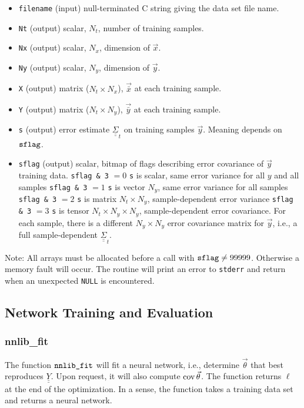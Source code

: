 \documentclass{article}    %
\newcommand{\dbul}[1]{\underline{\underline{#1}}}
\newcommand{\cov}{\mathop{{\rm cov}}}
\begin{document}
\begin{itemize}
\item \verb|filename| (input) null-terminated C string giving the data set file name.
\item \verb|Nt| (output) scalar, $N_t$, number of training samples.
\item \verb|Nx| (output) scalar, $N_x$, dimension of $\vec{x}$.
\item \verb|Ny| (output) scalar, $N_y$, dimension of $\vec{y}$.
\item \verb|X| (output) matrix ($N_t \times N_x$), $\vec{\bar{x}}$ at each training sample.
\item \verb|Y| (output) matrix ($N_t \times N_y$), $\vec{\bar{y}}$ at each training sample.
\item \verb|s| (output) error estimate $\dbul{\Sigma}_t$ on training samples $\vec{y}$. Meaning depends on $\verb|sflag|$.
\item \verb|sflag| (output) scalar, bitmap of flags describing error covariance of $\vec{y}$ training data.
  \subitem \verb|sflag & 3| $=0$ \verb|s| is scalar, same error variance for all $y$ and all samples
  \subitem \verb|sflag & 3| $=1$ \verb|s| is vector $N_y$, same error variance for all samples
  \subitem \verb|sflag & 3| $=2$ \verb|s| is matrix $N_t \times N_y$, sample-dependent error variance
  \subitem \verb|sflag & 3| $=3$ \verb|s| is tensor $N_t \times N_y
  \times N_y$, sample-dependent error covariance. For each sample,
  there is a different $N_y \times N_y$ error covariance matrix for
  $\vec{y}$, i.e., a full sample-dependent $\dbul{\Sigma}_t$.
\end{itemize}
Note: All arrays must be allocated before a call with $\verb|sflag|
\ne 99999$. Otherwise a memory fault will occur. The routine will print an error to \verb|stderr|
and return when an unexpected \verb|NULL| is encountered.

\subsection{Network Training and Evaluation}

\subsubsection{nnlib\_fit}

The function $\verb|nnlib_fit|$ will fit a neural network, i.e.,
determine $\vec{\theta}$ that best reproduces $\dbul{Y}$. Upon
request, it will also compute $\cov\vec\theta$. The function returns
$\ell$ at the end of the optimization. In a sense, the function takes
a training data set and returns a neural network.
\end{document}

